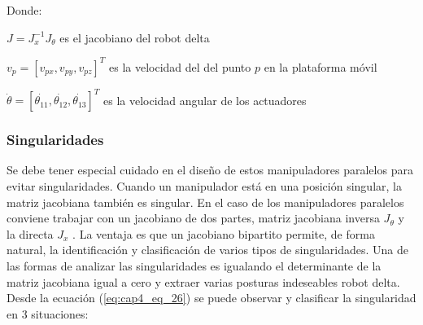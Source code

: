         
     Donde: \par

       $J=J_{x}^{-1}J_{ \theta }$  es el jacobiano del robot delta

        $v_{p}= \left[ v_{px},v_{py},v_{pz} \right] ^{T}$ es la velocidad del del punto  $p$ en la plataforma móvil

        $\dot{ \theta }= \left[ \dot{ \theta _{11}},\dot{ \theta _{12}},\dot{ \theta _{13}}  \right] ^{T}$  es la velocidad angular de los actuadores
        
        \newpage

        
        \subsubsection{Singularidades}\label{CAP4_SINGULARIDAD}
        
        Se debe tener especial cuidado en el diseño de estos manipuladores paralelos para evitar singularidades. Cuando un manipulador está en una posición singular, la matriz jacobiana también es singular. En el caso de los manipuladores paralelos conviene trabajar con un jacobiano de dos partes, matriz jacobiana inversa   $J_{ \theta }$  y la directa  $ J_{x} $ . La ventaja es que un jacobiano bipartito permite, de forma natural, la identificación y clasificación de varios tipos de singularidades. Una de las formas de analizar las singularidades es igualando el determinante de la matriz jacobiana igual a cero y extraer varias posturas indeseables robot delta. Desde la ecuación  (\ref{eq:cap4_eq_26}) se puede observar y clasificar la singularidad en 3 situaciones:
        
